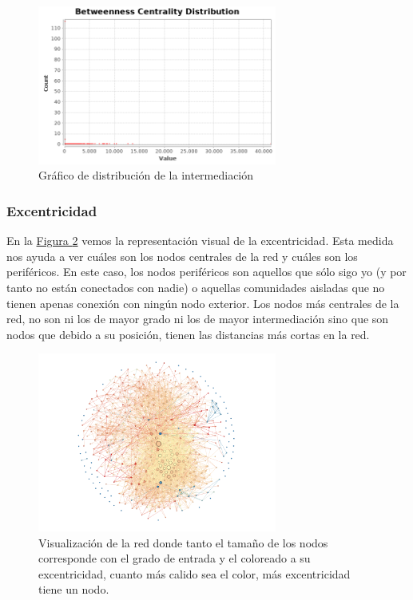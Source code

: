 \documentclass[10pt,a4paper,spanish]{article}
\numberwithin{equation}{section} %
\numberwithin{figure}{section} %
\numberwithin{table}{section} %
\begin{document}
\begin{figure}[!h]
    \centering
    \includegraphics[width=0.7\textwidth]{distance-report/Betweenness-Centrality-Distribution}
    \caption{Gráfico de distribución de la intermediación}
    \label{bet}
\end{figure}

\subsubsection{Excentricidad}
En la \hyperref[excentricidad]{Figura \ref*{excentricidad}} vemos la representación visual de la excentricidad. Esta medida nos ayuda a ver cuáles son los nodos centrales de la red y cuáles son los periféricos. En este caso, los nodos periféricos son aquellos que sólo sigo yo (y por tanto no están conectados con nadie) o aquellas comunidades aisladas que no tienen apenas conexión con ningún nodo exterior. Los nodos más centrales de la red, no son ni los de mayor grado ni los de mayor intermediación sino que son nodos que debido a su posición, tienen las distancias más cortas en la red. 

\begin{figure}[!h]
    \centering
    \includegraphics[width=0.7\textwidth]{medidas_locales/excentricidad}
    \caption{Visualización de la red donde tanto el tamaño de los nodos corresponde con el grado de entrada y el coloreado a su excentricidad, cuanto más calido sea el color, más excentricidad tiene un nodo.}
    \label{excentricidad}
\end{figure}
\end{document}
